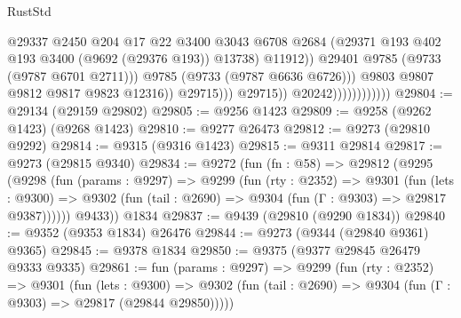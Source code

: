\begin{lexlean}{RustStd}
\begin{coremodule}
                                                  @29337
                                                  @2450
                                                  @204
                                                  @17
                                                  @22
                                                  @3400
                                                  @3043
                                                  @6708
                                                  @2684
                                                  (@29371
                                                    @193
                                                    @402
                                                    @193
                                                    @3400
                                                    (@9692 (@29376 @193))
                                                    @13738)
                                                  @11912))
                                              @29401
                                              @9785
                                              (@9733 (@9787 @6701 @2711)))
                                            @9785
                                            (@9733 (@9787 @6636 @6726)))
                                          @9803
                                          @9807
                                          @9812
                                          @9817
                                          @9823
                                          @12316))
                                      @29715)))
                                @29715))
                            @20242))))))))))))
@29804 := @29134 (@29159 @29802)
@29805 := @9256 @1423
@29809 := @9258 (@9262 @1423) (@9268 @1423)
@29810 := @9277 @26473
@29812 := @9273 (@29810 @9292)
@29814 := @9315 (@9316 @1423)
@29815 := @9311 @29814
@29817 := @9273 (@29815 @9340)
@29834 := @9272
    (fun (fn : @58) =>
    @29812
      (@9295
        (@9298
          (fun (params : @9297) =>
          @9299
            (fun (rty : @2352) =>
            @9301
              (fun (lets : @9300) =>
              @9302 (fun (tail : @2690) => @9304 (fun (Γ : @9303) => @29817 @9387))))))
        @9433))
    @1834
@29837 := @9439 (@29810 (@9290 @1834))
@29840 := @9352 (@9353 @1834) @26476
@29844 := @9273 (@9344 (@29840 @9361) @9365)
@29845 := @9378 @1834
@29850 := @9375 (@9377 @29845 @26479 @9333 @9335)
@29861 := fun (params : @9297) =>
  @9299
    (fun (rty : @2352) =>
    @9301
      (fun (lets : @9300) =>
      @9302 (fun (tail : @2690) => @9304 (fun (Γ : @9303) => @29817 (@29844 @29850)))))

\end{coremodule}
\end{lexlean}
